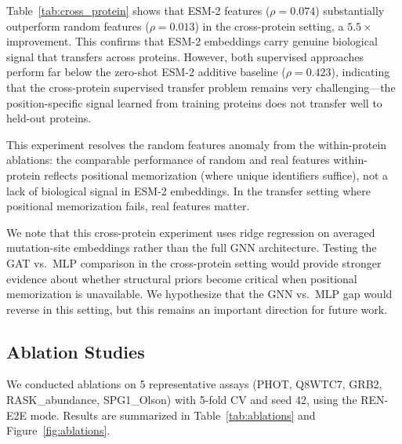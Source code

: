 \documentclass{article}
\newcommand{\rene}{\textsc{REN-E2E}}
\begin{document}
Table~\ref{tab:cross_protein} shows that ESM-2 features ($\rho = 0.074$) substantially outperform random features ($\rho = 0.013$) in the cross-protein setting, a $5.5\times$ improvement. This confirms that ESM-2 embeddings carry genuine biological signal that transfers across proteins. However, both supervised approaches perform far below the zero-shot ESM-2 additive baseline ($\rho = 0.423$), indicating that the cross-protein supervised transfer problem remains very challenging---the position-specific signal learned from training proteins does not transfer well to held-out proteins.

This experiment resolves the random features anomaly from the within-protein ablations: the comparable performance of random and real features within-protein reflects positional memorization (where unique identifiers suffice), not a lack of biological signal in ESM-2 embeddings. In the transfer setting where positional memorization fails, real features matter.

We note that this cross-protein experiment uses ridge regression on averaged mutation-site embeddings rather than the full GNN architecture. Testing the GAT vs.\ MLP comparison in the cross-protein setting would provide stronger evidence about whether structural priors become critical when positional memorization is unavailable. We hypothesize that the GNN vs.\ MLP gap would reverse in this setting, but this remains an important direction for future work.

\subsection{Ablation Studies}
\label{sec:ablations}

We conducted ablations on 5 representative assays (PHOT, Q8WTC7, GRB2, RASK\_abundance, SPG1\_Olson) with 5-fold CV and seed 42, using the \rene{} mode. Results are summarized in Table~\ref{tab:ablations} and Figure~\ref{fig:ablations}.
\end{document}
